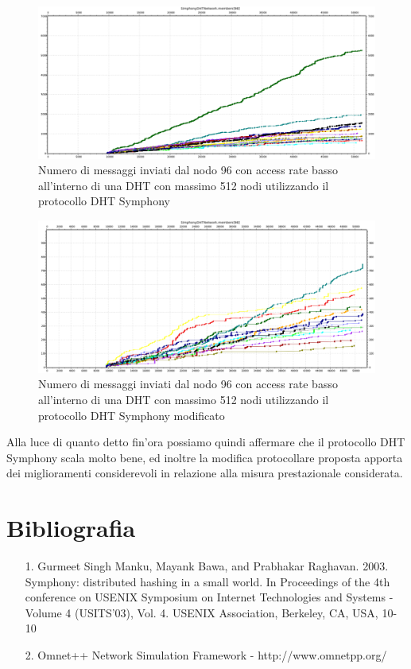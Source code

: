 \documentclass[	
	DIV=calc,
	paper=a4,
	fontsize=11pt,
	onecolumn
]{scrartcl} %
\begin{document}
	\begin{figure}[H]
		\centering
		\includegraphics[scale=0.35]	{SymphonyDHT/plots/MessagesSentByEveryNode/512_Nodes_SlowAccess/SymphonyDHT_512Nodes_SlowAccess_Node96.png}
		\caption{Numero di messaggi inviati dal nodo 96 con access rate basso all'interno di una DHT con massimo 512 nodi utilizzando il protocollo DHT Symphony}
		\label{Figura 42}
	\end{figure}
	\begin{figure}[H]
		\centering
		\includegraphics[scale=0.35]	{SymphonyDHTMod/plots/MessagesSentByEveryNode/512_Nodes_SlowAccess/SymphonyDHTMod_512Nodes_SlowAccess_Node96.png}
		\caption{Numero di messaggi inviati dal nodo 96 con access rate basso all'interno di una DHT con massimo 512 nodi utilizzando il protocollo DHT Symphony modificato}
		\label{Figura 43}
	\end{figure}				
			
	Alla luce di quanto detto fin'ora possiamo quindi affermare che il protocollo DHT Symphony scala molto bene, ed inoltre la modifica protocollare proposta apporta dei miglioramenti considerevoli in relazione alla misura prestazionale considerata.
	
\section{Bibliografia}
\begin{itemize}
\item[1.] Gurmeet Singh Manku, Mayank Bawa, and Prabhakar Raghavan. 2003. Symphony: distributed
hashing in a small world. In Proceedings of the 4th conference on USENIX Symposium on
Internet Technologies and Systems - Volume 4 (USITS'03), Vol. 4. USENIX Association,
Berkeley, CA, USA, 10-10
\item[2.] Omnet++ Network Simulation Framework - http://www.omnetpp.org/ 
\end{itemize}
\end{document}
